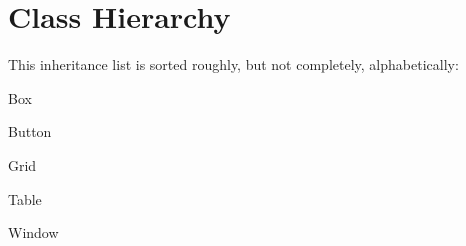 \section{Class Hierarchy}
This inheritance list is sorted roughly, but not completely, alphabetically\+:\begin{DoxyCompactList}
\item Box\begin{DoxyCompactList}
\item {}
\item {}
\item {}
\end{DoxyCompactList}
\item Button\begin{DoxyCompactList}
\item {}
\end{DoxyCompactList}
\item {}
\item Grid\begin{DoxyCompactList}
\item {}
\end{DoxyCompactList}
\item {}
\item Table\begin{DoxyCompactList}
\item {}
\item {}
\end{DoxyCompactList}
\item Window\begin{DoxyCompactList}
\item {}
\end{DoxyCompactList}
\end{DoxyCompactList}
